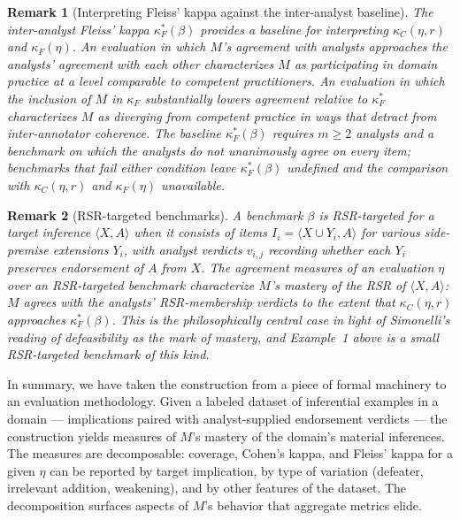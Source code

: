 \documentclass[11pt]{article}
\newtheorem{remark}{Remark}
\begin{document}
\begin{remark}[Interpreting Fleiss' kappa against the inter-analyst baseline]
The inter-analyst Fleiss' kappa $\kappa_F^*(\beta)$ provides a baseline for interpreting $\kappa_C(\eta, r)$ and $\kappa_F(\eta)$. An evaluation in which $M$'s agreement with analysts approaches the analysts' agreement with each other characterizes $M$ as participating in domain practice at a level comparable to competent practitioners. An evaluation in which the inclusion of $M$ in $\kappa_F$ substantially lowers agreement relative to $\kappa_F^*$ characterizes $M$ as diverging from competent practice in ways that detract from inter-annotator coherence. The baseline $\kappa^*_F(\beta)$ requires $m \geq 2$ analysts and a benchmark on which the analysts do not unanimously agree on every item; benchmarks that fail either condition leave $\kappa^*_F(\beta)$ undefined and the comparison with $\kappa_C(\eta, r)$ and $\kappa_F(\eta)$ unavailable.
\end{remark}

\begin{remark}[RSR-targeted benchmarks]
A benchmark $\beta$ is RSR-targeted for a target inference $\langle X, A \rangle$ when it consists of items $I_i = \langle X \cup Y_i, A \rangle$ for various side-premise extensions $Y_i$, with analyst verdicts $v_{i,j}$ recording whether each $Y_i$ preserves endorsement of $A$ from $X$. The agreement measures of an evaluation $\eta$ over an RSR-targeted benchmark characterize $M$'s mastery of the RSR of $\langle X, A \rangle$: $M$ agrees with the analysts' RSR-membership verdicts to the extent that $\kappa_C(\eta, r)$ approaches $\kappa_F^*(\beta)$. This is the philosophically central case in light of Simonelli's reading of defeasibility as the mark of mastery, and Example~1 above is a small RSR-targeted benchmark of this kind.
\end{remark}

In summary, we have taken the construction from a piece of formal machinery to an evaluation methodology. Given a labeled dataset of inferential examples in a domain — implications paired with analyst-supplied endorsement verdicts — the construction yields measures of $M$'s mastery of the domain's material inferences. The measures are decomposable: coverage, Cohen's kappa, and Fleiss' kappa for a given $\eta$ can be reported by target implication, by type of variation (defeater, irrelevant addition, weakening), and by other features of the dataset. The decomposition surfaces aspects of $M$'s behavior that aggregate metrics elide.
\end{document}
